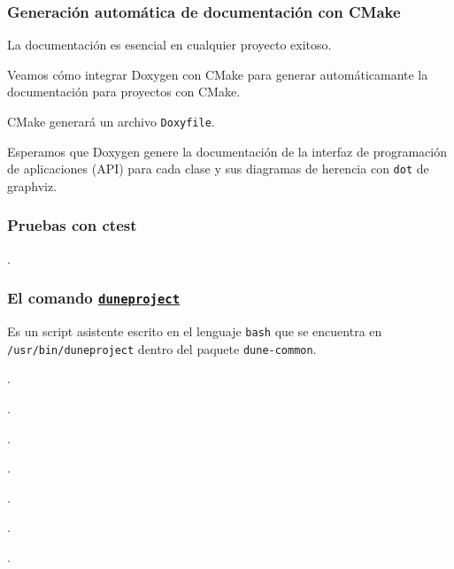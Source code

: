 \begin{frame}[fragile]
	\frametitle{Generación automática de documentación con CMake}
	La documentación es esencial en cualquier proyecto exitoso.

	Veamos cómo integrar Doxygen con CMake para generar
	automáticamante la documentación para proyectos con CMake.

	CMake generará un archivo \lstinline{Doxyfile}.

	Esperamos que Doxygen genere la documentación de la interfaz de
	programación de aplicaciones (API) para cada clase y sus
	diagramas de herencia con \lstinline{dot} de graphviz.
\end{frame}

\begin{frame}[fragile]
	\frametitle{Pruebas con ctest}
	.
\end{frame}



\begin{frame}[fragile]
	\frametitle{El comando \href{https://gitlab.dune-project.org/core/dune-common/-/raw/master/bin/duneproject}{\lstinline{duneproject}}}

	Es un script asistente escrito en el lenguaje \lstinline{bash}
	que se encuentra en \lstinline{/usr/bin/duneproject}
	dentro del paquete \lstinline{dune-common}.
\end{frame}

\begin{frame}
	.
\end{frame}

\begin{frame}
	.
\end{frame}

\begin{frame}
	.
\end{frame}

\begin{frame}
	.
\end{frame}

\begin{frame}
	.
\end{frame}

\begin{frame}
	.
\end{frame}

\begin{frame}
	.
\end{frame}

